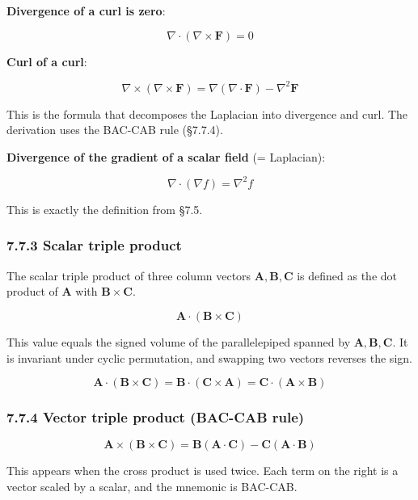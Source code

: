 \textbf{Divergence of a curl is zero}:

\[\nabla \cdot (\nabla \times \mathbf{F}) = 0\]

\textbf{Curl of a curl}:

\[\nabla \times (\nabla \times \mathbf{F}) = \nabla(\nabla \cdot \mathbf{F}) - \nabla^2 \mathbf{F}\]

This is the formula that decomposes the Laplacian into divergence and
curl. The derivation uses the BAC-CAB rule (§7.7.4).

\textbf{Divergence of the gradient of a scalar field} (= Laplacian):

\[\nabla \cdot (\nabla f) = \nabla^2 f\]

This is exactly the definition from §7.5.

\hypertarget{scalar-triple-product}{%
\subsubsection{7.7.3 Scalar triple
product}\label{scalar-triple-product}}

The scalar triple product of three column vectors
\(\mathbf{A}, \mathbf{B}, \mathbf{C}\) is defined as the dot product of
\(\mathbf{A}\) with \(\mathbf{B}\times\mathbf{C}\).

\[\mathbf{A} \cdot (\mathbf{B} \times \mathbf{C})\]

This value equals the signed volume of the parallelepiped spanned by
\(\mathbf{A}, \mathbf{B}, \mathbf{C}\). It is invariant under cyclic
permutation, and swapping two vectors reverses the sign.

\[\mathbf{A} \cdot (\mathbf{B} \times \mathbf{C}) = \mathbf{B} \cdot (\mathbf{C} \times \mathbf{A}) = \mathbf{C} \cdot (\mathbf{A} \times \mathbf{B})\]

\hypertarget{vector-triple-product-bac-cab-rule}{%
\subsubsection{7.7.4 Vector triple product (BAC-CAB
rule)}\label{vector-triple-product-bac-cab-rule}}

\[\mathbf{A} \times (\mathbf{B} \times \mathbf{C}) = \mathbf{B}(\mathbf{A} \cdot \mathbf{C}) - \mathbf{C}(\mathbf{A} \cdot \mathbf{B})\]

This appears when the cross product is used twice. Each term on the
right is a vector scaled by a scalar, and the mnemonic is BAC-CAB.

